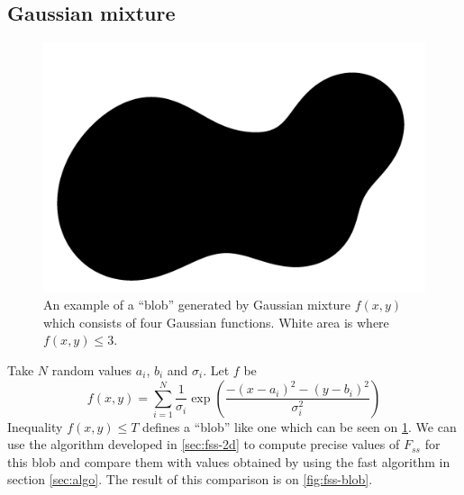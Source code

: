 \documentclass[reprint,amsmath,amssymb,aps,pre,showkeys,showpacs]{revtex4-1}
\begin{document}
\subsection{Gaussian mixture}
\label{sec:gauss}
\begin{figure}
  \centering
  \includegraphics[width=0.8\linewidth, frame]{images/blob.png}
  \caption[]{An example of a ``blob'' generated by Gaussian mixture $f(x,y)$
    which consists of four Gaussian functions. White area is where
    $f(x,y) \le 3$.}
  \label{fig:blob}
\end{figure}
Take $N$ random values $a_i$, $b_i$ and $\sigma_i$. Let $f$ be
\begin{equation*}
  f(x,y) = \sum_{i=1}^N \frac{1}{\sigma_i} \exp(\frac{-(x-a_i)^2-(y-b_i)^2}{\sigma_i^2})
\end{equation*}
Inequality $f(x,y) \le T$ defines a ``blob'' like one which can be seen on
\cref{fig:blob}. We can use the algorithm developed in \cref{sec:fss-2d} to
compute precise values of $F_{ss}$ for this blob and compare them with values
obtained by using the fast algorithm in section \cref{sec:algo}. The result of
this comparison is on \cref{fig:fss-blob}.
\end{document}
